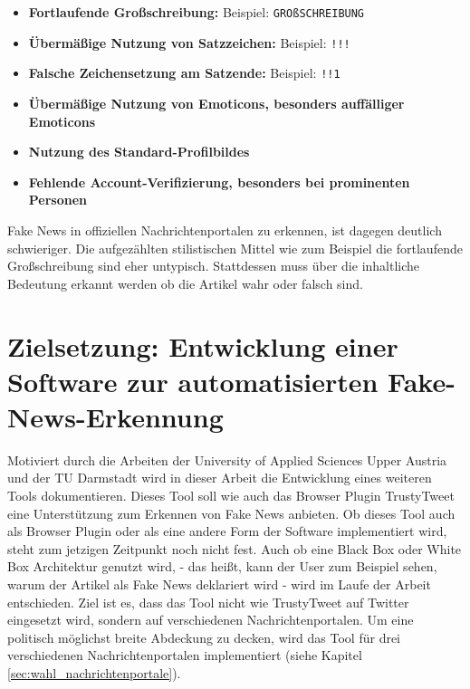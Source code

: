 \begin{itemize}
    \item \textbf{Fortlaufende Großschreibung:} Beispiel: \texttt{GROßSCHREIBUNG}
    
    \item \textbf{Übermäßige Nutzung von Satzzeichen:} Beispiel: \texttt{!!!}
    
    \item \textbf{Falsche Zeichensetzung am Satzende:} Beispiel: \texttt{!!1}
    
    \item \textbf{Übermäßige Nutzung von Emoticons, besonders auffälliger Emoticons}
    
    \item \textbf{Nutzung des Standard-Profilbildes}
    
    \item \textbf{Fehlende Account-Verifizierung, besonders bei prominenten Personen}
\end{itemize}

Fake News in offiziellen Nachrichtenportalen zu erkennen, ist dagegen deutlich schwieriger.
Die aufgezählten stilistischen Mittel wie zum Beispiel die fortlaufende Großschreibung sind eher untypisch.
Stattdessen muss über die inhaltliche Bedeutung erkannt werden ob die Artikel wahr oder falsch sind.


\section{Zielsetzung: Entwicklung einer Software zur automatisierten Fake-News-Erkennung}
\label{sec:zielsetzung}

Motiviert durch die Arbeiten der University of Applied Sciences Upper Austria \cite{Simone2022} und der TU Darmstadt \cite{Hartwig2021} wird in 
dieser Arbeit die Entwicklung eines weiteren Tools dokumentieren.
Dieses Tool soll wie auch das Browser Plugin TrustyTweet eine Unterstützung zum Erkennen von Fake News anbieten.
Ob dieses Tool auch als Browser Plugin oder als eine andere Form der Software implementiert wird, steht zum jetzigen Zeitpunkt noch nicht fest.
Auch ob eine Black Box oder White Box Architektur genutzt wird, - das heißt, kann der User zum Beispiel sehen, warum der Artikel als Fake News 
deklariert wird - wird im Laufe der Arbeit entschieden.
Ziel ist es, dass das Tool nicht wie TrustyTweet auf Twitter eingesetzt wird, sondern auf verschiedenen Nachrichtenportalen.
Um eine politisch möglichst breite Abdeckung zu decken, wird das Tool für drei verschiedenen Nachrichtenportalen implementiert 
(siehe Kapitel \ref{sec:wahl_nachrichtenportale}).

